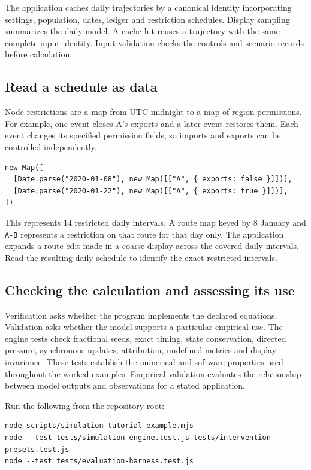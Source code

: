 \documentclass[11pt,a4paper]{article}
\begin{document}
The application caches daily trajectories by a canonical identity
incorporating settings, population, dates, ledger and restriction
schedules. Display sampling summarizes the daily model. A cache hit
reuses a trajectory with the same complete input identity. Input
validation checks the controls and scenario records before calculation.

\subsection{Read a schedule as data}\label{read-a-schedule-as-data}

Node restrictions are a map from UTC midnight to a map of region
permissions. For example, one event closes A's exports and a later event
restores them. Each event changes its specified permission fields, so
imports and exports can be controlled independently.

\begin{verbatim}
new Map([
  [Date.parse("2020-01-08"), new Map([["A", { exports: false }]])],
  [Date.parse("2020-01-22"), new Map([["A", { exports: true }]])],
])
\end{verbatim}

This represents 14 restricted daily intervals. A route map keyed by 8
January and \texttt{A-B} represents a restriction on that route for that
day only. The application expands a route edit made in a coarse display
across the covered daily intervals. Read the resulting daily schedule to
identify the exact restricted intervals.

\subsection{Checking the calculation and assessing its
use}\label{checking-the-calculation-and-assessing-its-use}

Verification asks whether the program implements the declared equations.
Validation asks whether the model supports a particular empirical use.
The engine tests check fractional seeds, exact timing, state
conservation, directed pressure, synchronous updates, attribution,
undefined metrics and display invariance. These tests establish the
numerical and software properties used throughout the worked examples.
Empirical validation evaluates the relationship between model outputs
and observations for a stated application.

Run the following from the repository root:

\begin{verbatim}
node scripts/simulation-tutorial-example.mjs
node --test tests/simulation-engine.test.js tests/intervention-presets.test.js
node --test tests/evaluation-harness.test.js
\end{verbatim}
\end{document}
